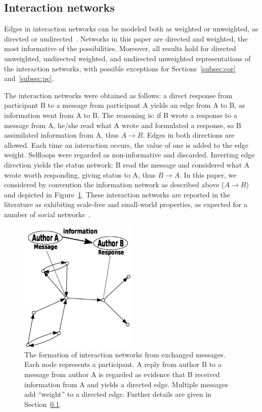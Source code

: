 \documentclass[review]{elsarticle}
\begin{document}
\subsection{Interaction networks}\label{intNet}
Edges in interaction networks can be modeled both as weighted or unweighted, as directed or undirected~\cite{bird,newmanCommunityDirected,newmanCommunity2013}.
Networks in this paper are directed and weighted, the most informative of the possibilities. Moreover, all results hold for directed unweighted, undirected weighted, and undirected unweighted representations of the interaction networks,
with possible exceptions for Sections~\ref{subsec:cor} and~\ref{subsec:pc}.

The interaction networks were obtained as follows:
a direct response from participant B to a message from participant A yields an edge from A to B,
as information went from A to B.
The reasoning is: if B wrote a response to a message from A,
he/she read what A wrote and formulated a response, so B assimilated information from A, thus $A \rightarrow B$.
Edges in both directions are allowed.
Each time an interaction occurs, the value of one is added to the edge weight.
Selfloops were regarded as non-informative and discarded.
Inverting edge direction yields the status network:
B read the message and considered what A wrote worth responding,
giving status to A, thus $B\rightarrow A$.
In this paper, we considered by convention the information network as described above ($A\rightarrow B$)
and depicted in Figure~\ref{formationNetwork}.
These interaction networks are reported in the literature as exhibiting scale-free
and small-world properties, as expected for a number of social networks~\cite{bird,newmanBook}.

\begin{figure}[!h]
\centering
\includegraphics[width=0.5\textwidth]{figs/criaRede3_}
\caption{The formation of interaction networks from exchanged messages. Each node represents a participant. A reply from author B to a message from author A is regarded as evidence that B received information from A and yields a directed edge. Multiple messages add ``weight'' to a directed edge. Further details are given in Section~\ref{intNet}.}
\label{formationNetwork}
\end{figure}
\end{document}
